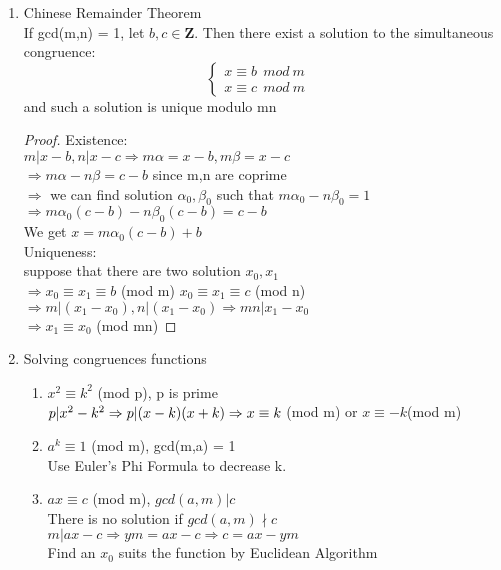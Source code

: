 \documentclass[10pt]{article}
\newcommand{\Zb}{\mathbf{Z}}
\begin{document}
\begin{multicols}{2}
\begin{enumerate}
	\item Chinese Remainder Theorem\\
	If gcd(m,n) = 1, let $b,c \in \Zb$. Then there exist a solution to the simultaneous congruence:
	\begin{equation}
	\left\{
		\begin{array}{lr}
		x \equiv b \ \ mod \ m &\\
		x \equiv c \ \ mod \ m
		\end{array}
	\right.
	\end{equation}
	and such a solution is unique modulo mn
	\begin{proof}
		Existence:\\
		$m|x-b, n|x-c\Rightarrow m\alpha = x-b, m\beta = x - c$\\
		$\Rightarrow m\alpha - n\beta = c-b$ since m,n are coprime\\
		$\Rightarrow$ we can find solution $\alpha_0, \beta_0$ such that $m\alpha_0-n\beta_0 = 1$\\
		$\Rightarrow m\alpha_0(c-b) -n\beta_0(c-b) = c-b$\\ We get $x = m\alpha_0(c-b)+b$\\
		Uniqueness:\\
		suppose that there are two solution $x_0, x_1$\\
		$\Rightarrow x_0 \equiv x_1 \equiv b$ (mod m) $x_0 \equiv x_1 \equiv c$ (mod n)\\
		$\Rightarrow m|(x_1 - x_0), n | (x_1 - x_0) \Rightarrow mn|x_1-x_0$\\
		$\Rightarrow x_1 \equiv x_0$ (mod mn)
	\end{proof}
	\item Solving congruences functions
	\begin{enumerate}
		\item $x^2 \equiv k^2$ (mod p), p is prime\\
		$p|x^2 - k^2 \Rightarrow p|(x-k)(x+k) \\ \Rightarrow x\equiv k$ (mod m) or $x\equiv -k$(mod m)
		\item $a^k \equiv 1$ (mod m), gcd(m,a) = 1\\
		Use Euler's Phi Formula to decrease k.
		\item $ax\equiv c$ (mod m), $gcd(a,m)|c$\\
		There is no solution if $gcd(a,m) \nmid c$\\
		$m|ax - c \Rightarrow ym = ax - c \Rightarrow c = ax - ym$\\
		Find an $x_0$ suits the function by Euclidean Algorithm\\

\end{enumerate}
\end{enumerate}
\end{multicols}
\end{document}
